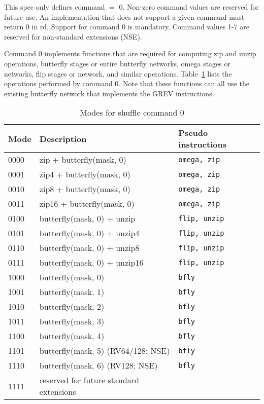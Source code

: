 This spec only defines command $=$ 0. Non-zero command values are reserved for
future use.  An implementation that does not support a given command must
return 0 in rd. Support for command 0 is mandatory. Command values 1-7 are
reserved for non-standard extensions (NSE).

Command 0 implements functions that are required for computing zip and unzip
operations, butterfly stages or entire butterfly networks, omega stages or networks, flip
stages or network, and similar operations. Table~\ref{shuffle-modes} lists the
operations performed by command 0. Note that these functions can all use the
existing butterfly network that implements the GREV instructions.

\begin{table}[h]
\begin{small}
\begin{center}
\begin{tabular}{l l l}
Mode & Description & Pseudo instructions \\ \hline

0000 & zip + butterfly(mask, 0)                    & {\tt omega, zip} \\
0001 & zip4 + butterfly(mask, 0)                   & {\tt omega, zip} \\
0010 & zip8 + butterfly(mask, 0)                   & {\tt omega, zip} \\
0011 & zip16 + butterfly(mask, 0)                  & {\tt omega, zip} \\
0100 & butterfly(mask, 0) + unzip                  & {\tt flip, unzip} \\
0101 & butterfly(mask, 0) + unzip4                 & {\tt flip, unzip} \\
0110 & butterfly(mask, 0) + unzip8                 & {\tt flip, unzip} \\
0111 & butterfly(mask, 0) + unzip16                & {\tt flip, unzip} \\

\hline

1000 & butterfly(mask, 0)                          & {\tt bfly} \\
1001 & butterfly(mask, 1)                          & {\tt bfly} \\
1010 & butterfly(mask, 2)                          & {\tt bfly} \\
1011 & butterfly(mask, 3)                          & {\tt bfly} \\
1100 & butterfly(mask, 4)                          & {\tt bfly} \\
1101 & butterfly(mask, 5) (RV64/128; NSE)          & {\tt bfly} \\
1110 & butterfly(mask, 6) (RV128; NSE)             & {\tt bfly} \\
1111 & reserved for future standard extensions     & --- \\

\end{tabular}
\end{center}
\end{small}
\caption{Modes for shuffle command 0}
\label{shuffle-modes}
\end{table}

